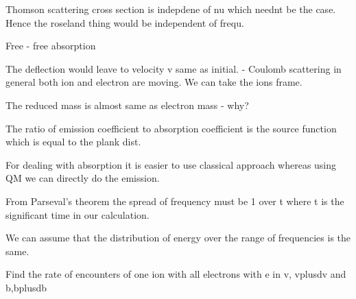 \documentclass{../template/texnote}
\begin{document}
Thomson scattering cross section is indepdene of nu which neednt be the case.
Hence the roseland thing would be independent of frequ.

Free - free absorption

The deflection would leave to velocity v same as initial. - Coulomb scattering 
in general both ion and electron are moving. 
We can take the ions frame.


The reduced mass is almost same as electron mass - why?

The ratio of emission coefficient to absorption coefficient is the source function which is equal to the plank dist.

For dealing with absorption it is easier to use classical approach whereas using QM we can directly do the emission.

From Parseval's theorem the spread of frequency must be 1 over t where t is the significant time in our calculation.

We can assume that the distribution of energy over the range of frequencies is the same.

Find the rate of encounters of one ion with all electrons with e in v, vplusdv and b,bplusdb

    \printbibliography
\end{document}

